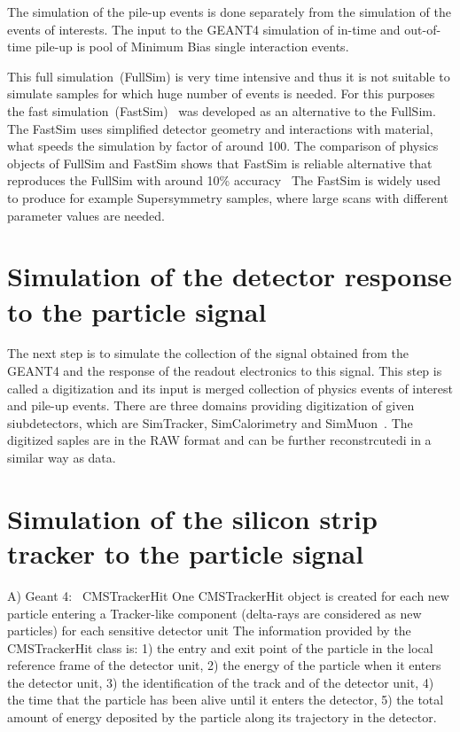 The simulation of the pile-up events is done separately from the simulation of the events of interests. The input to  the GEANT4 simulation of in-time and out-of-time pile-up is pool of Minimum Bias single interaction events.

This full simulation~(FullSim) is very time intensive and thus it is not suitable to simulate samples for which huge number of events is needed. For this purposes the fast simulation~(FastSim)~\cite{Sekmen:2017hzs, CMS:2010spa, Giammanco:2014bza} was developed as an alternative to the FullSim. The FastSim uses simplified detector geometry and interactions with material, what speeds the simulation by factor of around 100. The comparison of physics objects of FullSim and FastSim shows that FastSim is reliable alternative that reproduces the FullSim with around 10\% accuracy~\cite{Abdullin:2011zz, Sekmen:2017hzs} The FastSim is widely used to produce for example Supersymmetry samples, where large scans with different parameter values are needed. 

\section{Simulation of the detector response to the particle signal}

The next step is to simulate the collection of the signal obtained from the GEANT4 and the response of the readout electronics to this signal. This step is called a digitization and its input is merged collection of physics events of interest and pile-up events. There are three domains providing digitization of given siubdetectors, which are SimTracker, SimCalorimetry and SimMuon~\cite{iwebsite:simdigi}. The digitized saples are in the RAW format and can be further reconstrcutedi in a similar way as data.

\section{Simulation of the silicon strip tracker to the particle signal}


A) Geant 4:~\cite{Lefebure:1364020}
CMSTrackerHit
One CMSTrackerHit object is created
for each new particle entering a Tracker-like component (delta-rays are considered as new particles)
for each sensitive detector unit
The information provided by the CMSTrackerHit class is:
1) the entry and exit point of the particle in the local reference frame of the detector unit,
2) the energy of the particle when it enters the detector unit,
3) the identification of the track and of the detector unit,
4) the time that the particle has been alive until it enters the detector,
5) the total amount of energy deposited by the particle along its trajectory in the detector.


